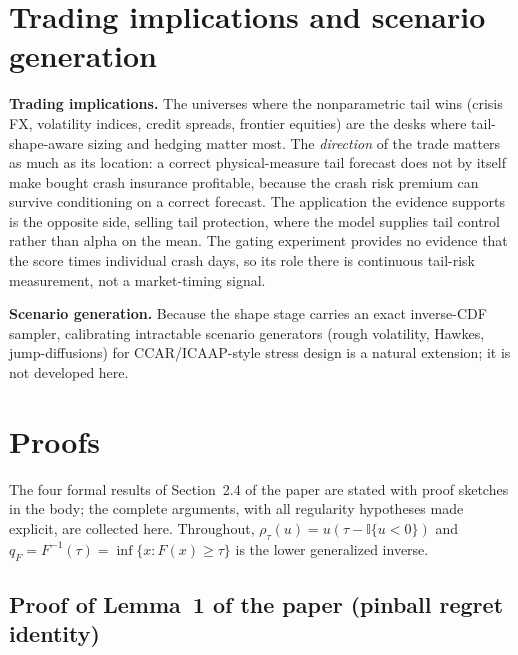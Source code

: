 \documentclass[11pt]{article}
\begin{document}
\section{Trading implications and scenario generation}
\textbf{Trading implications.} The universes where the nonparametric tail wins (crisis FX, volatility indices, credit spreads, frontier equities) are the desks where tail-shape-aware
sizing and hedging matter most. The \emph{direction} of the trade matters
as much as its location: a correct physical-measure tail forecast
does not by itself make bought crash insurance profitable, because the
crash risk premium can survive conditioning on a correct forecast.
The application the evidence supports is the opposite side, selling tail
protection, where the model supplies tail control rather than alpha on
the mean. The gating experiment provides no evidence that the score times
individual crash days, so its role there is continuous tail-risk
measurement, not a market-timing signal.

\textbf{Scenario generation.} Because the shape stage carries an exact
inverse-CDF sampler, calibrating intractable scenario generators
(rough volatility, Hawkes, jump-diffusions) for CCAR/ICAAP-style
stress design is a natural extension; it is not developed here.



\clearpage
\section{Proofs}\label{app:proofs}

The four formal results of Section~2.4 of the paper are stated with
proof sketches in the body; the complete arguments, with all regularity
hypotheses made explicit, are collected here. Throughout, $\rho_\tau(u)
= u(\tau - \mathbb{I}\{u<0\})$ and $q_F = F^{-1}(\tau) = \inf\{x:F(x)\ge
\tau\}$ is the lower generalized inverse.

\subsection*{Proof of Lemma~1 of the paper (pinball regret identity)}
\end{document}
